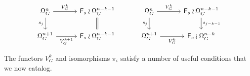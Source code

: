 \documentclass[a4paper,10pt]{article}%
\begin{document}
\begin{remark}
\begin{equation}\label{PIIDEFDI2 EQ}
\begin{tikzcd}[row sep=1.7em,column sep = 3em]
	\Omega_{G}^{n} \ar{d}[swap]{s_{j}} \ar{r}{V_G^k} &
	|[alias=F1]|
	\Fin_s \wr \Omega_{G}^{n-k-1}
	\ar[equal]{d} 
&
	\Omega_{G}^{n} \ar{d}[swap]{s_{j}} \ar{r}{V_G^k} &
	\Fin_s \wr \Omega_{G}^{n-k-1}
	\ar{d}{s_{j-k-1}} 
\\
	|[alias=G2]|
	\Omega_{G}^{n+1} \ar{r}[swap]{V_G^{k+1}}&
	\Fin_s \wr \Omega_{G}^{n-k-1}  
&
	\Omega_{G}^{n+1} \ar{r}[swap]{V_G^{k}}&
	\Fin_s \wr \Omega_{G}^{n-k}  
\end{tikzcd}
\end{equation}
\end{remark}

The functors $V^k_G$ and isomorphisms $\pi_i$ satisfy a number of useful conditions that we now catalog.
\end{document}
